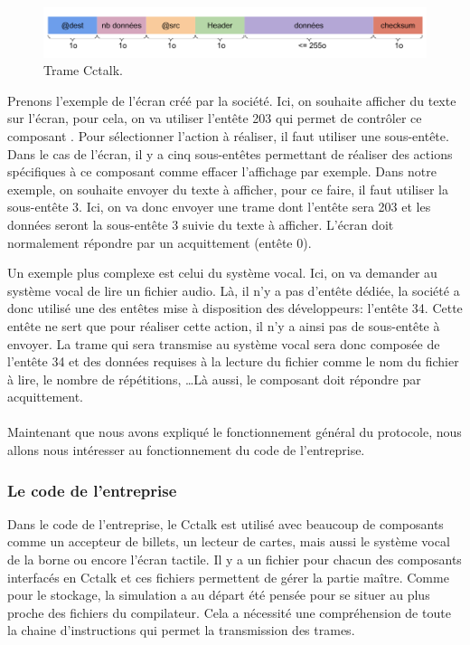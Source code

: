 \documentclass[a4paper]{article}
\begin{document}
\begin{figure}[h!]
  \begin{center}
  \includegraphics[scale=0.4]{./img/trame-cctalk.png}
  \caption{Trame Cctalk.}
    \label{tramecctalk}
  \end{center}
\end{figure}

Prenons l'exemple de l'écran créé par la société. Ici, on souhaite afficher du
texte sur l'écran, pour cela, on va utiliser l'entête 203 qui permet de
contrôler ce composant \cite{cctalkpt2}. Pour sélectionner l'action à réaliser,
il faut utiliser une sous-entête. Dans le cas de l'écran, il y a cinq
sous-entêtes permettant de réaliser des actions spécifiques à ce composant comme
effacer l'affichage par exemple. Dans notre exemple, on souhaite envoyer du
texte à afficher, pour ce faire, il faut utiliser la sous-entête 3. Ici, on va
donc envoyer une trame dont l'entête sera 203 et les données seront la
sous-entête 3 suivie du texte à afficher. L'écran doit normalement répondre par
un acquittement (entête 0).

Un exemple plus complexe est celui du système vocal. Ici, on va demander au
système vocal de lire un fichier audio. Là, il n'y a pas d'entête dédiée, la
société a donc utilisé une des entêtes mise à disposition des développeurs:
l'entête 34. Cette entête ne sert que pour réaliser cette action, il n'y a ainsi
pas de sous-entête à envoyer. La trame qui sera transmise au système vocal sera
donc composée de l'entête 34 et des données requises à la lecture du fichier
comme le nom du fichier à lire, le nombre de répétitions, \dots Là aussi, le
composant doit répondre par acquittement.
\\~\\

Maintenant que nous avons expliqué le fonctionnement général du protocole, nous
allons nous intéresser au fonctionnement du code de l'entreprise.

\subsubsection{Le code de l'entreprise}

Dans le code de l'entreprise, le Cctalk est utilisé avec beaucoup de composants
comme un accepteur de billets, un lecteur de cartes, mais aussi le système vocal
de la borne ou encore l'écran tactile. Il y a un fichier pour chacun des
composants interfacés en Cctalk et ces fichiers permettent de gérer la partie
maître. Comme pour le stockage, la simulation a au départ été pensée pour se
situer au plus proche des fichiers du compilateur. Cela a nécessité une
compréhension de toute la chaine d'instructions qui permet la transmission des
trames.
\end{document}
